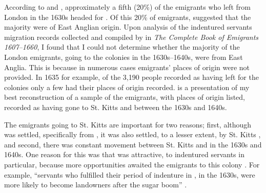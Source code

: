 \label{6.2.1.1.1}
According to \citet{Menard06} and \citet{Parker11}, approximately a fifth (20\%) of the emigrants who left from London in the 1630s headed for . Of this 20\% of emigrants, \citet{Currer82} suggested that the majority were of East Anglian origin. Upon analysis of the indentured servants migration records collected and compiled by \citet{Coldham92} in \emph{The Complete Book of Emigrants 1607--1660}, I found that I could not determine whether the majority of the London emigrants, going to the  colonies in the 1630s--1640s, were from East Anglia. This is because in numerous cases emigrants' places of origin were not provided. In 1635 for example, of the 3,190 people recorded as having left for the colonies \citep{Menard06} only a few had their places of origin recorded.   is a presentation of my best reconstruction of a sample of the emigrants, with places of origin listed, recorded as having gone to St. Kitts and  between the 1630s and 1640s.

The emigrants going to St. Kitts are important for two reasons; first, although  was settled, specifically from , it was also settled, to a lesser extent, by St. Kitts \citep{Sainsbury60}, and second, there was constant movement between St. Kitts and  in the 1630s and 1640s. One reason for this was that  was attractive, to indentured servants in particular, because more opportunities awaited the emigrants to this colony \citep{Menard06}. For example, ``servants who fulfilled their period of indenture in , in the 1630s, were more likely to become landowners after the sugar boom'' \citep[25]{Menard06}.

